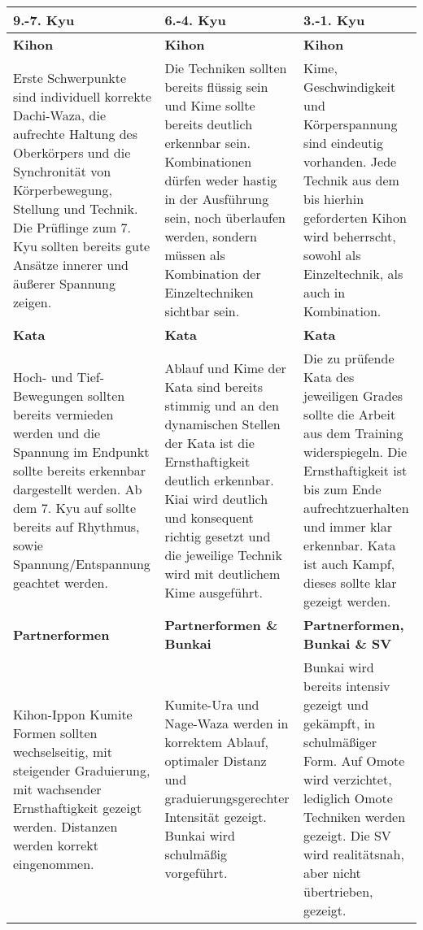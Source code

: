 	\null\vfill\null
	\begin{tabularx}{\linewidth}{XXX}
		9.-7. Kyu	& 6.-4. Kyu	& 3.-1. Kyu\\
		\midrule
		{\footnotesize \textbf{Kihon}}&{\footnotesize \textbf{Kihon}}&{\footnotesize \textbf{Kihon}}\\
		{\footnotesize Erste Schwerpunkte sind individuell korrekte Dachi-Waza, die aufrechte Haltung des Oberkörpers und die Synchronität von Körperbewegung, Stellung und Technik. Die Prüflinge zum 7. Kyu sollten bereits gute Ansätze innerer und äußerer Spannung zeigen.}&{\footnotesize Die Techniken sollten bereits flüssig sein und Kime sollte bereits deutlich erkennbar sein. Kombinationen dürfen weder hastig in der Ausführung sein, noch überlaufen werden, sondern müssen als Kombination der Einzeltechniken sichtbar sein.}&{\footnotesize Kime, Geschwindigkeit und Körperspannung sind eindeutig vorhanden. Jede Technik aus dem bis hierhin geforderten Kihon wird beherrscht, sowohl als Einzeltechnik, als auch in Kombination.}\\
		{\footnotesize \textbf{Kata}}&{\footnotesize \textbf{Kata}}&{\footnotesize \textbf{Kata}}\\
		{\footnotesize Hoch- und Tief-Bewegungen sollten bereits vermieden werden und die Spannung im Endpunkt sollte bereits erkennbar dargestellt werden. Ab dem 7. Kyu auf sollte bereits auf Rhythmus, sowie Spannung/Entspannung geachtet werden.}&{\footnotesize Ablauf und Kime der Kata sind bereits stimmig und an den dynamischen Stellen der Kata ist die Ernsthaftigkeit deutlich erkennbar. Kiai wird deutlich und konsequent richtig gesetzt und die jeweilige Technik wird mit deutlichem Kime ausgeführt.}&{\footnotesize Die zu prüfende Kata des jeweiligen Grades sollte die Arbeit aus dem Training widerspiegeln. Die Ernsthaftigkeit ist bis zum Ende aufrechtzuerhalten und immer klar erkennbar. Kata ist auch Kampf, dieses sollte klar gezeigt werden.}\\
		{\footnotesize \textbf{Partnerformen}}&{\footnotesize \textbf{Partnerformen \& Bunkai}}&{\footnotesize \textbf{Partnerformen, Bunkai \& SV}}\\
		{\footnotesize Kihon-Ippon Kumite Formen sollten wechselseitig, mit steigender Graduierung, mit wachsender Ernsthaftigkeit gezeigt werden. Distanzen werden korrekt eingenommen.}&{\footnotesize Kumite-Ura und Nage-Waza werden in korrektem Ablauf, optimaler Distanz und graduierungsgerechter Intensität gezeigt. Bunkai wird schulmäßig vorgeführt.}&{\footnotesize Bunkai wird bereits intensiv gezeigt und gekämpft, in schulmäßiger Form. Auf Omote wird verzichtet, lediglich Omote Techniken werden gezeigt. Die SV wird realitätsnah, aber nicht übertrieben, gezeigt.}\\
	\end{tabularx}\null\vfill\null
	\setlength{\tabcolsep}{6pt}